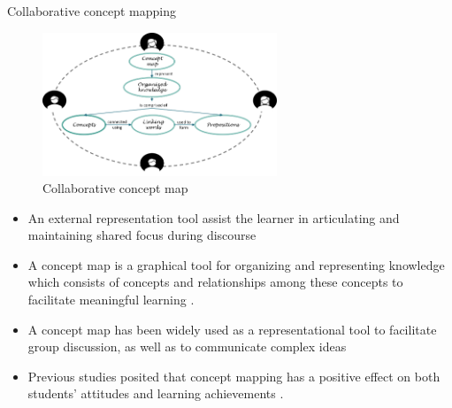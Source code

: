 \begin{frame}[allowframebreaks]{Collaborative concept mapping}

    \begin{figure}[tb]
        \begin{center}
            \includegraphics[width=70mm]{images/ccm.png}
        \end{center}
        \caption{Collaborative concept map}
        \label{intro::ccm}
    \end{figure}
    
    \begin{itemize}
        \item An external representation tool assist the learner in articulating 
        and maintaining shared focus during discourse \cite{Fischer2002FosteringTools,Suthers2006TechnologyCSCL,vanBoxtel2002CollaborativeDiscourse}
        \item A concept map is a graphical tool for organizing and representing knowledge which consists of concepts and relationships among these concepts to facilitate meaningful learning \cite{novak1984learning}.
        \item A concept map has been widely used as a representational tool to facilitate group
        discussion, as well as to communicate complex ideas 
        \cite{Fischer2002FosteringTools,Gracia-Moreno2017CollaborativeWorkspaces,Suthers2006TechnologyCSCL,vanBoxtel2000CollaborativeKnowledge}

        \item Previous studies posited that concept mapping has a positive effect on both students’ attitudes and learning achievements \cite{Basque2006CollaborativeTrends,Czerniak1998TheScience}.
    \end{itemize}
\end{frame}

